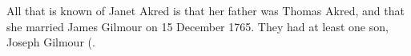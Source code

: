 
All that is known of Janet Akred is that her father was Thomas Akred, and that she married James Gilmour on 15 December 1765. They had at least one son, Joseph Gilmour (.
